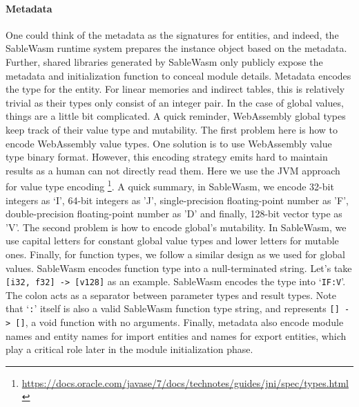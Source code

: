 \paragraph{Metadata}
One could think of the metadata as the signatures for entities, and indeed, the SableWasm runtime system prepares the instance object based on the metadata. Further, shared libraries generated by SableWasm only publicly expose the metadata and initialization function to conceal module details. Metadata encodes the type for the entity. For linear memories and indirect tables, this is relatively trivial as their types only consist of an integer pair. In the case of global values, things are a little bit complicated. A quick reminder, WebAssembly global types keep track of their value type and mutability. The first problem here is how to encode WebAssembly value types. One solution is to use WebAssembly value type binary format. However, this encoding strategy emits hard to maintain results as a human can not directly read them. Here we use the JVM approach for value type encoding \footnote{\url{https://docs.oracle.com/javase/7/docs/technotes/guides/jni/spec/types.html}}. A quick summary, in SableWasm, we encode 32-bit integers as `I', 64-bit integers as 'J', single-precision floating-point number as 'F', double-precision floating-point number as 'D' and finally, 128-bit vector type as 'V'. The second problem is how to encode global's mutability. In SableWasm, we use capital letters for constant global value types and lower letters for mutable ones. Finally, for function types, we follow a similar design as we used for global values. SableWasm encodes function type into a null-terminated string. Let's take \texttt{[i32, f32] -> [v128]} as an example. SableWasm encodes the type into `\texttt{IF:V}'. The colon acts as a separator between parameter types and result types. Note that `\texttt{:}' itself is also a valid SableWasm function type string, and represents \texttt{[] -> []}, a void function with no arguments. Finally, metadata also encode module names and entity names for import entities and names for export entities, which play a critical role later in the module initialization phase.

